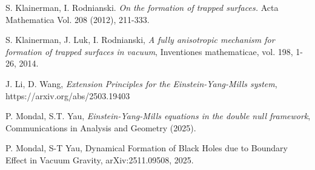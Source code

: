 \documentclass{article}[11pt]
\numberwithin{equation}{section}
\begin{document}
\begin{thebibliography}{}
  S. Klainerman, I. Rodnianski. \textit{On the formation of trapped surfaces.} Acta Mathematica Vol. 208 (2012), 
211-333.

 S. Klainerman, J. Luk, I. Rodnianski, \textit{A fully anisotropic mechanism for formation of trapped surfaces in vacuum}, Inventiones mathematicae, vol. 198, 1-26, 2014.  




 J. Li, D. Wang, \textit{Extension Principles for the Einstein-Yang-Mills system}, https://arxiv.org/abs/2503.19403



 P. Mondal, S.T. Yau, \textit{Einstein-Yang-Mills equations in the double null framework},  Communications in Analysis and Geometry (2025).

 P. Mondal, S-T Yau, Dynamical Formation of Black Holes due to Boundary Effect in Vacuum Gravity, arXiv:2511.09508, 2025.











\end{thebibliography}
\end{document}

